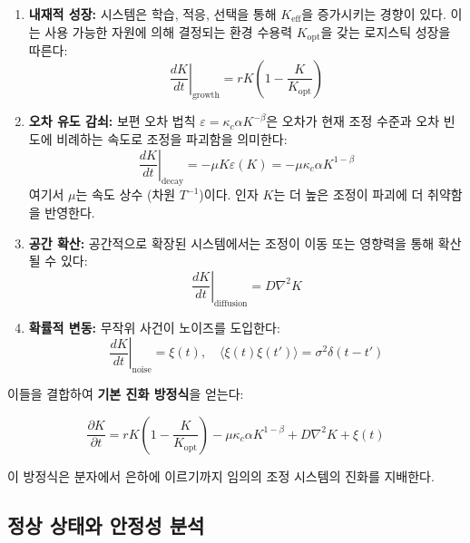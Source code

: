 \documentclass[12pt,a4paper]{article}
\newcommand{\Keff}{K_{\mathrm{eff}}}
\newcommand{\Keffopt}{K_{\mathrm{opt}}}
\newcommand{\kappac}{\kappa_c}
\newcommand{\eps}{\varepsilon}
\theoremstyle{remark}
\begin{document}
	\begin{enumerate}
		\item \textbf{내재적 성장:} 시스템은 학습, 적응, 선택을 통해 \(\Keff\)을 증가시키는 경향이 있다. 이는 사용 가능한 자원에 의해 결정되는 환경 수용력 \(\Keffopt\)을 갖는 로지스틱 성장을 따른다:
		\begin{equation}
			\left.\frac{dK}{dt}\right|_{\text{growth}} = r K \left(1 - \frac{K}{\Keffopt}\right)
			\label{eq:growth}
		\end{equation}
		
		\item \textbf{오차 유도 감쇠:} 보편 오차 법칙 \(\eps = \kappac \alpha K^{-\beta}\)은 오차가 현재 조정 수준과 오차 빈도에 비례하는 속도로 조정을 파괴함을 의미한다:
		\begin{equation}
			\left.\frac{dK}{dt}\right|_{\text{decay}} = -\mu K \eps(K) = -\mu \kappac \alpha K^{1-\beta}
			\label{eq:decay}
		\end{equation}
		여기서 \(\mu\)는 속도 상수 (차원 \(T^{-1}\))이다. 인자 \(K\)는 더 높은 조정이 파괴에 더 취약함을 반영한다.
		
		\item \textbf{공간 확산:} 공간적으로 확장된 시스템에서는 조정이 이동 또는 영향력을 통해 확산될 수 있다:
		\begin{equation}
			\left.\frac{dK}{dt}\right|_{\text{diffusion}} = D \nabla^2 K
			\label{eq:diffusion}
		\end{equation}
		
		\item \textbf{확률적 변동:} 무작위 사건이 노이즈를 도입한다:
		\begin{equation}
			\left.\frac{dK}{dt}\right|_{\text{noise}} = \xi(t), \quad \langle \xi(t)\xi(t')\rangle = \sigma^2 \delta(t-t')
			\label{eq:noise}
		\end{equation}
	\end{enumerate}
	
	이들을 결합하여 \textbf{기본 진화 방정식}을 얻는다:
	
	\begin{equation}
		\boxed{\frac{\partial K}{\partial t} = r K \left(1 - \frac{K}{\Keffopt}\right) - \mu \kappac \alpha K^{1-\beta} + D \nabla^2 K + \xi(t)}
		\label{eq:evolution}
	\end{equation}
	
	이 방정식은 분자에서 은하에 이르기까지 임의의 조정 시스템의 진화를 지배한다.
	
	\subsection{정상 상태와 안정성 분석}
	
\end{document}
